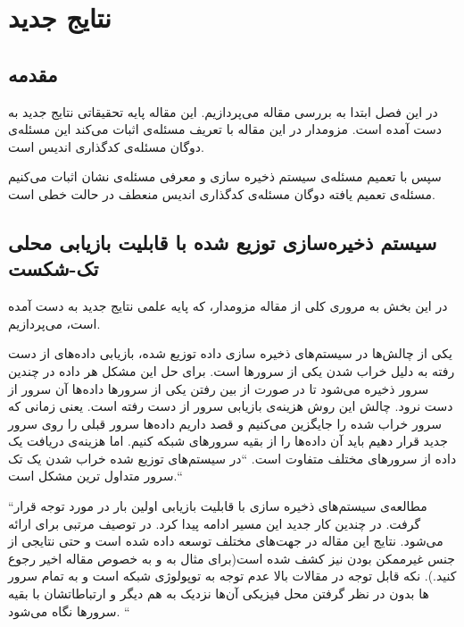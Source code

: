 \chapter{
نتایج جدید
}
\section{مقدمه}
در این فصل ابتدا به بررسی مقاله
\cite{arya}
 می‌پردازیم. این مقاله پایه تحقیقاتی نتایج جدید به دست آمده است. مزومدار در این مقاله با تعریف مسئله‌ی 
اثبات می‌کند این مسئله‌ی دوگان مسئله‌ی کدگذاری اندیس است.

سپس با تعمیم مسئله‌ی سیستم ذخیره سازی و معرفی مسئله‌ی
 نشان اثبات می‌کنیم مسئله‌ی تعمیم یافته دوگان مسئله‌ی کدگذاری اندیس منعطف در حالت خطی  است.
\newpage

\section{
 سیستم ذخیره‌سازی توزیع شده با قابلیت بازیابی محلی تک-شکست
}
در این بخش به مروری کلی از مقاله مزومدار، که پایه علمی نتایج جدید به دست آمده است، می‌پردازیم.

یکی از چالش‌ها در سیستم‌های ذخیره سازی داده توزیع شده، بازیابی داده‌های از دست رفته به دلیل خراب شدن یکی از سرورها است. 
برای حل این مشکل هر داده در چندین سرور ذخیره می‌شود تا در صورت از بین رفتن یکی از سرورها داده‌ها آن سرور از دست نرود. چالش این روش هزینه‌ی بازیابی سرور از دست رفته است. یعنی زمانی که سرور خراب شده را جایگزین می‌کنیم و قصد داریم داده‌ها سرور قبلی را روی سرور جدید قرار دهیم باید آن داده‌ها را از بقیه سرورهای شبکه 
کنیم. اما هزینه‌ی دریافت یک داده از سرورهای مختلف متفاوت است.
``در سیستم‌های توزیع شده خراب شدن یک تک سرور متداول ترین مشکل است.``

``مطالعه‌ی سیستم‌های ذخیره سازی با قابلیت بازیابی اولین بار در
\cite{5550492}
مورد توجه قرار گرفت. در چندین کار جدید این مسیر ادامه پیدا کرد. در
\cite{6259860}
توصیف مرتبی برای
ارائه می‌شود. نتایج این مقاله در جهت‌های مختلف توسعه داده شده است و حتی نتایجی از جنس غیرممکن بودن نیز کشف شده است(برای مثال به
\cite{
	6570829, kamath2013codes,6818438,silberstein2013optimal, tamo2013optimal}
و به خصوص مقاله اخیر 
\cite{Tamo_2014}
رجوع کنید.). نکه قابل توجه در مقالات بالا عدم توجه به توپولوژی شبکه است و به تمام سرور ها بدون در نظر گرفتن محل فیزیکی آن‌ها نزدیک به هم دیگر و ارتباطاتشان با بقیه سرورها نگاه می‌شود.
 ``
 
